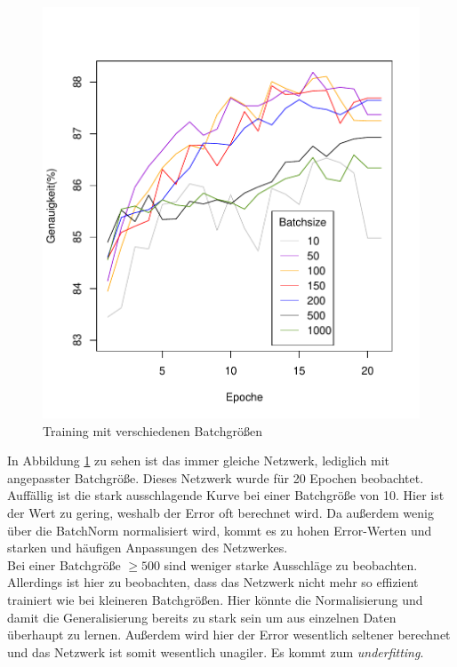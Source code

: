 \begin{figure}[H]
	\centering
	\includegraphics[scale=0.9]{./bilder/batchsize_measurement}
	\caption{Training mit verschiedenen Batchgrößen}
	\label{fig:batchsize}
\end{figure}
In Abbildung \ref{fig:batchsize} zu sehen ist das immer gleiche Netzwerk, lediglich mit angepasster Batchgröße. Dieses Netzwerk wurde für 20 Epochen beobachtet.\\
Auffällig ist die stark ausschlagende Kurve bei einer Batchgröße von 10. Hier ist der Wert zu gering, weshalb der Error oft berechnet wird. Da außerdem wenig über die BatchNorm normalisiert wird, kommt es zu hohen Error-Werten und starken und häufigen Anpassungen des Netzwerkes.\\
Bei einer Batchgröße $\geq 500$ sind weniger starke Ausschläge zu beobachten. Allerdings ist hier zu beobachten, dass das Netzwerk nicht mehr so effizient trainiert wie bei kleineren Batchgrößen. Hier könnte die Normalisierung und damit die Generalisierung bereits zu stark sein um aus einzelnen Daten überhaupt zu lernen. Außerdem wird hier der Error wesentlich seltener berechnet und das Netzwerk ist somit wesentlich unagiler. Es kommt zum \textit{underfitting}.\\
